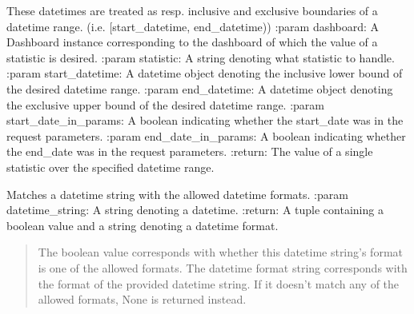 \documentclass[letterpaper,10pt,english]{sphinxmanual}
\begin{document}
\begin{fulllineitems}
\label{\detokenize{pydash_web.controller.dashboard_statistic:pydash_web.controller.dashboard_statistic.handle_statistic_without_timeslice}}
These datetimes are treated as resp. inclusive and exclusive boundaries of a datetime range. (i.e. {[}start\_datetime, end\_datetime))
:param dashboard: A Dashboard instance corresponding to the dashboard of which the value of a statistic is desired.
:param statistic: A string denoting what statistic to handle.
:param start\_datetime: A datetime object denoting the inclusive lower bound of the desired datetime range.
:param end\_datetime: A datetime object denoting the exclusive upper bound of the desired datetime range.
:param start\_date\_in\_params: A boolean indicating whether the start\_date was in the request parameters.
:param end\_date\_in\_params: A boolean indicating whether the end\_date was in the request parameters.
:return: The value of a single statistic over the specified datetime range.

\end{fulllineitems}


\begin{fulllineitems}
\label{\detokenize{pydash_web.controller.dashboard_statistic:pydash_web.controller.dashboard_statistic.match_datetime_string_with_formats}}
Matches a datetime string with the allowed datetime formats.
:param datetime\_string: A string denoting a datetime.
:return: A tuple containing a boolean value and a string denoting a datetime format.
\begin{quote}

The boolean value corresponds with whether this datetime string’s format is one of the allowed formats.
The datetime format string corresponds with the format of the provided datetime string. If it doesn’t match any of
the allowed formats, None is returned instead.
\end{quote}

\end{fulllineitems}
\end{document}
